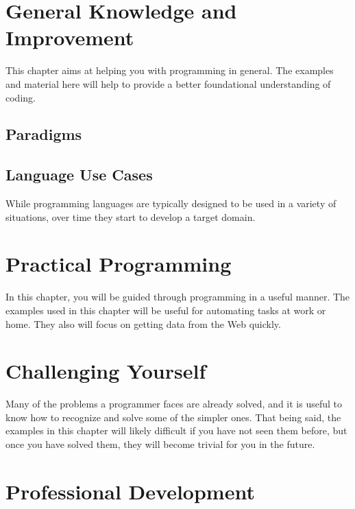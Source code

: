 \documentclass[12pt, oneside, a4paper]{book}
\begin{document}
   \chapter{General Knowledge and Improvement}
   \label{chap:general}
      This chapter aims at helping you with programming in general.
      The examples and material here will help to provide a better foundational understanding of coding.
      \section{Paradigms}
      \section{Language Use Cases}
         While programming languages are typically designed to be used in a variety of situations, over time they start to develop a target domain.

   \chapter{Practical Programming}
   \label{chap:practical}
      In this chapter, you will be guided through programming in a useful manner.
      The examples used in this chapter will be useful for automating tasks at work or home.
      They also will focus on getting data from the Web quickly.
   \chapter{Challenging Yourself}
      Many of the problems a programmer faces are already solved, and it is useful to know how to recognize and solve some of the simpler ones.
      That being said, the examples in this chapter will likely difficult if you have not seen them before, but once you have solved them, they will become trivial for you in the future.
   \label{chap:challenge}
   \chapter{Professional Development}
   \label{chap:prof_devel}
\end{document}
